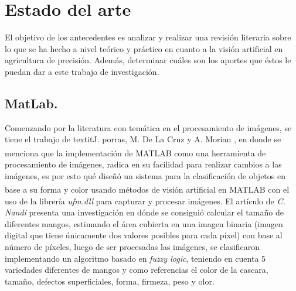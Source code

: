 \chapter{Estado del arte}

	El objetivo de los antecedentes es analizar y realizar una revisión literaria sobre lo  que  se  ha hecho  a  nivel  teórico  y  práctico  en  cuanto a  la visión artificial en agricultura de precisión.  Además,  determinar  cuáles son los aportes que éstos le puedan dar a este trabajo de investigación.


\section{MatLab.}

	Comenzando por la literatura con temática en el procesamiento de imágenes, se tiene el trabajo de textit{J. porras, M. De La Cruz y A. Morian} \cite{article3}, en donde se menciona que la implementación de MATLAB\textsuperscript{\textregistered} como una herramienta de procesamiento de imágenes, radica en su facilidad para realizar cambios a las imágenes, es por esto qué diseñó un sistema para la clasificación de objetos en base a su forma y color usando métodos de visión artificial en MATLAB\textsuperscript{\textregistered} con el uso de la librería \textit{ufm.dll} para capturar y procesar imágenes. El artículo de \textit{C. Nandi} \cite{inproceedings} presenta una investigación en dónde se consiguió calcular el tamaño de diferentes mangos, estimando el área cubierta en una imagen binaria (imagen digital que tiene únicamente dos valores posibles para cada píxel) con base al número de píxeles, luego de ser procesadas las imágenes, se clasificaron implementando un algoritmo basado en \textit{fuzzy logic}, teniendo en cuenta 5 variedades diferentes de mangos y como referencias el color de la cascara, tamaño, defectos superficiales, forma, firmeza, peso y olor.\\

